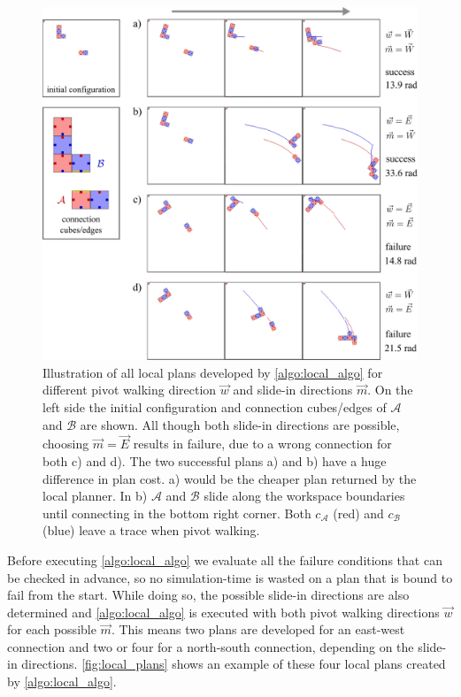 \begin{figure}
	\centering
	\includegraphics[width=1\textwidth]{figures/local_plans.pdf}
	\caption[Local plans for all pivot walking and slide-in directions]{Illustration of all local plans developed by \autoref{algo:local_algo} for different pivot walking direction $\vec{w}$ and slide-in directions $\vec{m}$. On the left side the initial configuration and connection cubes/edges of $\mathcal{A}$ and $\mathcal{B}$ are shown. All though both slide-in directions are possible, choosing $\vec{m}=\vec{E}$ results in failure, due to a wrong connection for both c) and d). The two successful plans a) and b) have a huge difference in plan cost. a) would be the cheaper plan returned by the local planner. In b) $\mathcal{A}$ and $\mathcal{B}$ slide along the workspace boundaries until connecting in the bottom right corner. Both $c_\mathcal{A}$ (red) and $c_\mathcal{B}$ (blue) leave a trace when pivot walking.}
	\label{fig:local_plans}
\end{figure}

Before executing \autoref{algo:local_algo} we evaluate all the failure conditions that can be checked in advance, so no simulation-time is wasted on a plan that is bound to fail from the start.
While doing so, the possible slide-in directions are also determined and \autoref{algo:local_algo} is executed with both pivot walking directions $\vec{w}$ for each possible $\vec{m}$.
This means two plans are developed for an east-west connection and two or four for a north-south connection, depending on the slide-in directions.
\autoref{fig:local_plans} shows an example of these four local plans created by \autoref{algo:local_algo}.

